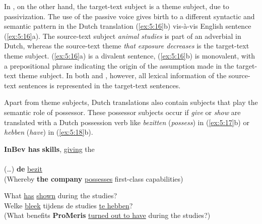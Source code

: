 \documentclass[output=paper]{LSP/langsci}
\begin{document}
In , on the other hand, the target-text subject is a theme subject, due to passivization. The use of the passive voice gives birth to a different syntactic and semantic pattern in the Dutch translation (\ref{ex:5:16}b) vis-à-vis English sentence (\ref{ex:5:16}a). The source-text subject \textit{animal studies} is part of an adverbial in Dutch, whereas the source-text theme \textit{that exposure decreases} is the target-text theme subject. (\ref{ex:5:16}a) is a divalent sentence, (\ref{ex:5:16}b) is monovalent, with a prepositional phrase indicating the origin of the assumption made in the target-text theme subject. In both  and , however, all lexical information of the source-text sentences is represented in the target-text sentences.    

Apart from theme subjects, Dutch translations also contain subjects that play the semantic role of possessor. These possessor subjects occur if \textit{give} or \textit{show} are translated with a Dutch possession verb like \textit{bezitten} (\textit{possess}) in (\ref{ex:5:17}b) or \textit{hebben} (\textit{have}) in (\ref{ex:5:18}b).  


\ea \label{ex:5:17}
\ea
\textbf{InBev has}  \textbf{skills}, \ul{giving} the \\ \,  \\[1em]
\ex
(\dots)  \textbf{de}   \ul{bezit}\\
(Whereby \textbf{the company} \ul{possesses} first-class capabilities)
\z
\z


\ea \label{ex:5:18}
\ea What  \ul{has}  \ul{shown} during the studies?\\[1em]
\ex Welke  \ul{bleek}  tijdens de studies \ul{te hebben}?\\
(What benefits \textbf{ProMeris} \ul{turned out to have} during the studies?)
\z
\z


\end{document}
